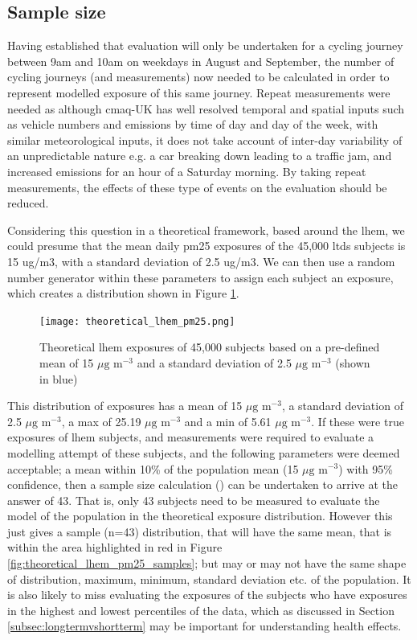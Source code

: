 \subsection{Sample size}
\label{subsec:samplesize}

Having established that evaluation will only be undertaken for a cycling journey between 9am and 10am on weekdays in August and September, the number of cycling journeys (and measurements) now needed to be calculated in order to represent modelled exposure of this same journey. Repeat measurements were needed as although \gls{cmaq}-UK has well resolved temporal and spatial inputs such as vehicle numbers and emissions by time of day and day of the week, with similar meteorological inputs, it does not take account of inter-day variability of an unpredictable nature e.g. a car breaking down leading to a traffic jam, and increased emissions for an hour of a Saturday morning. By taking repeat measurements, the effects of these type of events on the evaluation should be reduced.

Considering this question in a theoretical framework, based around the \gls{lhem}, we could presume that the mean daily \gls{pm25} exposures of the 45,000 \gls{ltds} subjects is 15 ug/m3, with a standard deviation of 2.5 ug/m3. We can then use a random number generator within these parameters to assign each subject an exposure, which creates a distribution shown in Figure \ref{fig:theoretical_lhem_pm25}.

\begin{figure}[H]
\centering
\texttt{[image: theoretical\_lhem\_pm25.png]}
\caption{Theoretical \gls{lhem} exposures of 45,000 subjects based on a pre-defined mean of 15 $\mu \text{g m}^{-3}$ and a standard deviation of 2.5 $\mu \text{g m}^{-3}$ (shown in blue)}
\label{fig:theoretical_lhem_pm25}
\end{figure}

This distribution of exposures has a mean of 15 $\mu \text{g m}^{-3}$, a standard deviation of 2.5 $\mu \text{g m}^{-3}$, a max of 25.19 $\mu \text{g m}^{-3}$ and a min of 5.61 $\mu \text{g m}^{-3}$. If these were true exposures of \gls{lhem} subjects, and measurements were required to evaluate a modelling attempt of these subjects, and the following parameters were deemed acceptable; a mean within 10\% of the population mean (15 $\mu \text{g m}^{-3}$) with 95\% confidence, then a sample size calculation (\cite{PennStateEberlyCollegeofScience2017}) can be undertaken to arrive at the answer of 43. That is, only 43 subjects need to be measured to evaluate the model of the population in the theoretical exposure distribution. However this just gives a sample (n=43) distribution, that will have the same mean, that is within the area highlighted in red in Figure \ref{fig:theoretical_lhem_pm25_samples}; but may or may not have the same shape of distribution, maximum, minimum, standard deviation etc. of the population. It is also likely to miss evaluating the exposures of the subjects who have exposures in the highest and lowest percentiles of the data, which as discussed in Section \ref{subsec:longtermvshortterm} may be important for understanding health effects.

